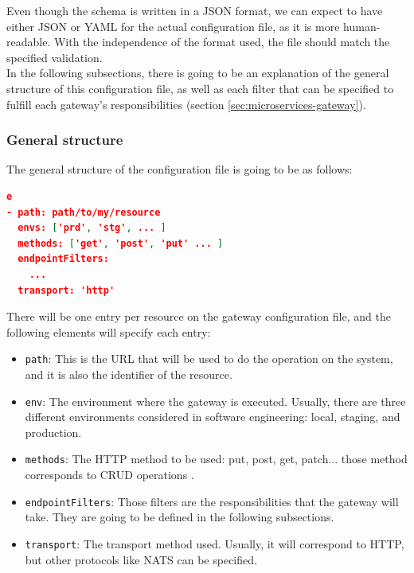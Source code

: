 \documentclass[english, 12pt, a4paper, sci, utf8, a-1b, online]{aaltothesis}
\begin{document}
Even though the schema is written in a JSON format, we can expect to have either JSON or YAML for the actual configuration file, as it is more human-readable. With the independence of the format used, the file should match the specified validation.\\

In the following subsections, there is going to be an explanation of the general structure of this configuration file, as well as each filter that can be specified to fulfill each gateway's responsibilities (section \ref{sec:microservices-gateway}).

\subsubsection*{General structure}

The general structure of the configuration file is going to be as follows: \\

\begin{lstlisting}[language=json,firstnumber=1]e
- path: path/to/my/resource
  envs: ['prd', 'stg', ... ]
  methods: ['get', 'post', 'put' ... ]
  endpointFilters:
    ...
  transport: 'http'
\end{lstlisting}

There will be one entry per resource on the gateway configuration file, and the following elements will specify each entry:

\begin{itemize}
    \item \texttt{path}: This is the URL that will be used to do the operation on the system, and it is also the identifier of the resource.
    \item \texttt{env}: The environment where the gateway is executed. Usually, there are three different environments considered in software engineering: local, staging, and production.
    \item \texttt{methods}: The HTTP method to be used: put, post, get, patch... those method corresponds to CRUD operations \cite{martin1983managing}.
    \item \texttt{endpointFilters}: Those filters are the responsibilities that the gateway will take. They are going to be defined in the following subsections.
    \item \texttt{transport}: The transport method used. Usually, it will correspond to HTTP, but other protocols like NATS can be specified.
\end{itemize}
\end{document}
